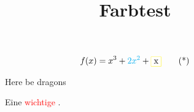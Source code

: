 \documentclass[a4paper]{amsart}
\title{Farbtest}
\begin{document}
\maketitle
\begin{equation}
    f(x) = x^3 + \textcolor{cyan}{2x^2} + \fcolorbox{yellow}{white}{x} \tag{*}\label{theFunction}
\end{equation}

\begin{figure}
    \caption{Eine \textcolor{red}{wichtige} .}
    \label{myFig}
    Here be dragons
\end{figure}
\end{document}
